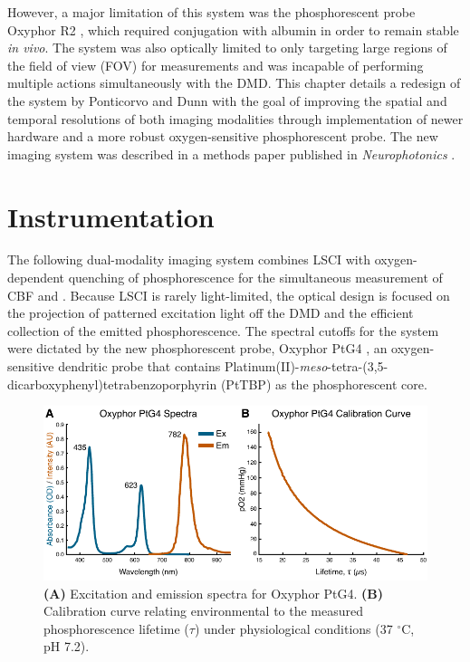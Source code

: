 However, a major limitation of this system was the phosphorescent probe Oxyphor R2 \cite{Dunphy:2002tz}, which required conjugation with albumin in order to remain stable \textit{in vivo}. The system was also optically limited to only targeting large regions of the field of view (FOV) for  measurements and was incapable of performing multiple actions simultaneously with the DMD. This chapter details a redesign of the system by Ponticorvo and Dunn \cite{Ponticorvo:2010uv} with the goal of improving the spatial and temporal resolutions of both imaging modalities through implementation of newer hardware and a more robust oxygen-sensitive phosphorescent probe. The new imaging system was described in a methods paper published in \textit{Neurophotonics} \cite{Sullender:2018ff}.



\section{Instrumentation}

The following dual-modality imaging system combines LSCI with oxygen-dependent quenching of phosphorescence for the simultaneous measurement of CBF and . Because LSCI is rarely light-limited, the optical design is focused on the projection of patterned excitation light off the DMD and the efficient collection of the emitted phosphorescence. The spectral cutoffs for the system were dictated by the new phosphorescent probe, Oxyphor PtG4 \cite{Esipova:2011hi}, an oxygen-sensitive dendritic probe that contains Platinum(II)-\textit{meso}-tetra-(3,5-dicarboxyphenyl)tetrabenzoporphyrin (PtTBP) as the phosphorescent core.

\begin{figure}
    \includegraphics{figures/chapter_2/oxyphorptg4.pdf}
    \caption{
        \label{fig:oxyphor_ptg4}
        \textbf{(A)} Excitation and emission spectra for Oxyphor PtG4. \textbf{(B)} Calibration curve relating environmental  to the measured phosphorescence lifetime ($\tau$) under physiological conditions (37 $^\circ$C, pH 7.2).
    }
\end{figure}

